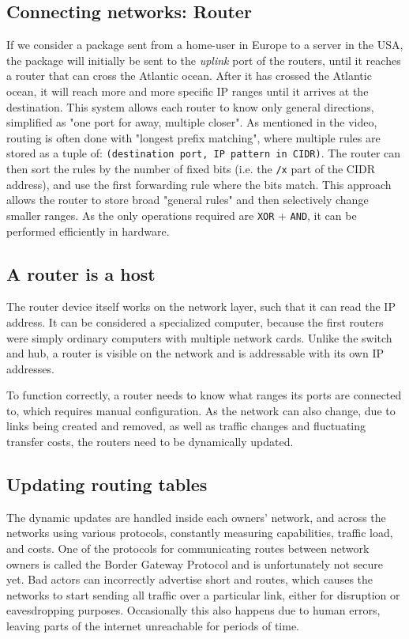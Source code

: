 \subsection{Connecting networks: Router}
If we consider a package sent from a home-user in Europe to a server in the USA, the package will initially be sent to the \emph{uplink} port of the routers, until it reaches a router that can cross the Atlantic ocean. After it has crossed the Atlantic ocean, it will reach more and more specific IP ranges until it arrives at the destination. This system allows each router to know only general directions, simplified as "one port for away, multiple closer". As mentioned in the video, routing is often done with "longest prefix matching", where multiple rules are stored as a tuple of: \texttt{(destination port, IP pattern in CIDR)}. The router can then sort the rules by the number of fixed bits (i.e. the \texttt{/x} part of the CIDR address), and use the first forwarding rule where the bits match. This approach allows the router to store broad "general rules" and then selectively change smaller ranges. As the only operations required are \texttt{XOR} + \texttt{AND}, it can be performed efficiently in hardware.

\subsection{A router is a host}
The router device itself works on the network layer, such that it can read the IP address. It can be considered a specialized computer, because the first routers were simply ordinary computers with multiple network cards. Unlike the switch and hub, a router is visible on the network and is addressable with its own IP addresses.

To function correctly, a router needs to know what ranges its ports are connected to, which requires manual configuration. As the network can also change, due to links being created and removed, as well as traffic changes and fluctuating transfer costs, the routers need to be dynamically updated.

\subsection{Updating routing tables}
The dynamic updates are handled inside each owners’ network, and across the networks using various protocols, constantly measuring capabilities, traffic load, and costs. One of the protocols for communicating routes between network owners is called the Border Gateway Protocol and is unfortunately not secure yet. Bad actors can incorrectly advertise short and routes, which causes the networks to start sending all traffic over a particular link, either for disruption or eavesdropping purposes. Occasionally this also happens due to human errors, leaving parts of the internet unreachable for periods of time.


